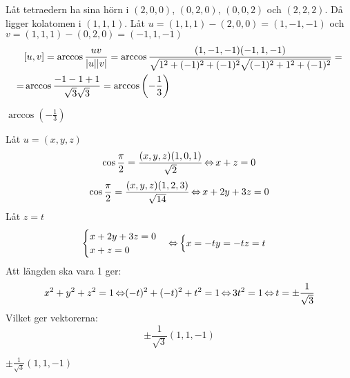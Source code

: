 \begin{task}{4.14}
	Låt tetraedern ha sina hörn i $(2,0,0)$, $(0,2,0)$, $(0,0,2)$ och $(2,2,2)$. Då ligger kolatomen i $(1,1,1)$.
	Låt $u = (1,1,1)-(2,0,0) = (1,-1,-1)$ och $v= (1,1,1)-(0,2,0) = (-1,1,-1)$
	\begin{align*}
		&[u,v] = \arccos\frac{u\*v}{|u||v|} =
		\arccos\frac{(1,-1,-1)\*(-1,1,-1)}{\sqrt{1^2+(-1)^2+(-1)^2}\sqrt{(-1)^2+1^2+(-1)^2}}= \\ =
		&\arccos\frac{-1-1+1}{\sqrt{3}\sqrt{3}}=
		\arccos\left(-\frac{1}{3}\right)
	\end{align*}

	\ans $\arccos\left(-\frac{1}{3}\right)$
\end{task}

\begin{task}{4.15}
	Låt $u=(x,y,z)$
	\[\cos\frac{\pi}{2}=\frac{(x,y,z)\*(1,0,1)}{\sqrt{2}} \lra
	x+z=0\]
	\[\cos\frac{\pi}{2}=\frac{(x,y,z)\*(1,2,3)}{\sqrt{14}} \lra
	x+2y+3z=0\]
	Låt $z=t$
	\[\begin{cases}
		x+2y+3z=0 \\
		x+z=0
	\end{cases} \operatorname{\Leftrightarrow}
	\begin{cases}
		x=-t
		y=-t
		z=t
	\end{cases} \]
	Att längden ska vara 1 ger:
	\[x^2+y^2+z^2=1 \operatorname{\Leftrightarrow}
	(-t)^2+(-t)^2+t^2=1 \operatorname{\Leftrightarrow}
	3t^2=1 \operatorname{\Leftrightarrow}
	t=\pm\frac{1}{\sqrt{3}}\]
	Vilket ger vektorerna:
	\[\pm\frac{1}{\sqrt{3}}(1,1,-1)\]

	\ans $\pm\frac{1}{\sqrt{3}}(1,1,-1)$
\end{task}

